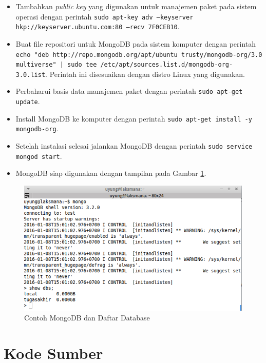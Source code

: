 \documentclass{ta-its}
\begin{document}
			\begin{itemize}
				\item Tambahkan \textit{public key} yang digunakan untuk manajemen paket pada sistem operasi dengan perintah \texttt{sudo apt-key adv --keyserver hkp://keyserver.ubuntu.com:80 --recv 7F0CEB10}.
				\item Buat file repositori untuk MongoDB pada sistem komputer dengan perintah \texttt{echo "deb http://repo.mongodb.org/apt/ubuntu trusty/mongodb-org/3.0 multiverse" | sudo tee /etc/apt/sources.list.d/mongodb-org-3.0.list}. Perintah ini disesuaikan dengan distro Linux yang digunakan.
				\item Perbaharui basis data manajemen paket dengan perintah \texttt{sudo apt-get update}.
				\item Install MongoDB ke komputer dengan perintah \texttt{sudo apt-get install -y mongodb-org}.
				\item Setelah instalasi selesai jalankan MongoDB dengan perintah \texttt{sudo service mongod start}.
				\item MongoDB siap digunakan dengan tampilan pada Gambar \ref{gambarCekMongoDB}.								
			\end{itemize}
			
			\begin{figure}[h] %
				\centering
				\includegraphics[width=0.8\linewidth]{contoh_img/cekmongodb}
				\caption{Contoh MongoDB dan Daftar Database}
				\label{gambarCekMongoDB}
			\end{figure}
	
	\chapter{Kode Sumber}
\end{document}
